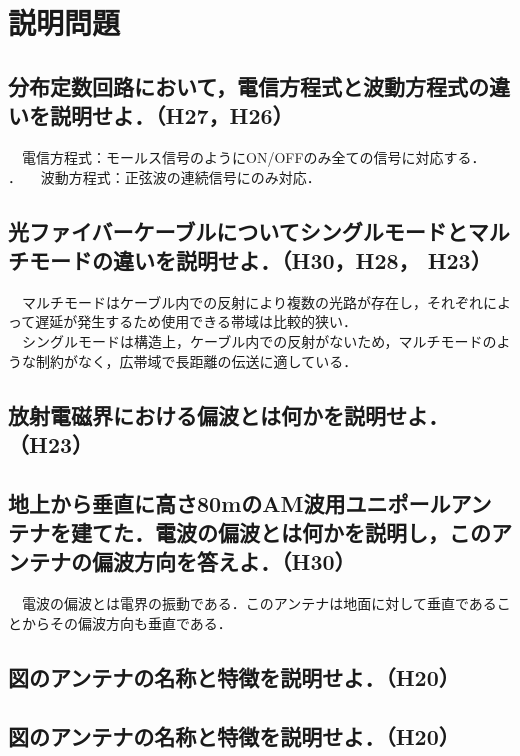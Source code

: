

\pagestyle{fancy}
\section{説明問題}
\subsection{分布定数回路において，電信方程式と波動方程式の違いを説明せよ．（H27，H26）}
　電信方程式：モールス信号のようにON/OFFのみ全ての信号に対応する．\\．
　波動方程式：正弦波の連続信号にのみ対応．

\subsection{光ファイバーケーブルについてシングルモードとマルチモードの違いを説明せよ．（H30，H28， H23）}
　マルチモードはケーブル内での反射により複数の光路が存在し，それぞれによって遅延が発生するため使用できる帯域は比較的狭い．\\
　シングルモードは構造上，ケーブル内での反射がないため，マルチモードのような制約がなく，広帯域で長距離の伝送に適している．

\subsection{放射電磁界における偏波とは何かを説明せよ．（H23）}

\subsection{地上から垂直に高さ80mのAM波用ユニポールアンテナを建てた．電波の偏波とは何かを説明し，このアンテナの偏波方向を答えよ．（H30）}
　電波の偏波とは電界の振動である．このアンテナは地面に対して垂直であることからその偏波方向も垂直である．

\subsection{図のアンテナの名称と特徴を説明せよ．（H20）}

\subsection{図のアンテナの名称と特徴を説明せよ．（H20）}

